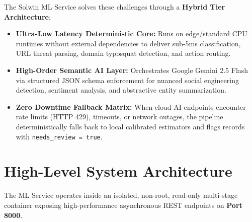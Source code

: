 \documentclass[11pt,a4paper]{article}
\begin{document}
The Solwin ML Service solves these challenges through a \textbf{Hybrid Tier Architecture}:
\begin{itemize}[leftmargin=*]
    \item \textbf{Ultra-Low Latency Deterministic Core:} Runs on edge/standard CPU runtimes without external dependencies to deliver sub-5ms classification, URL threat parsing, domain typosquat detection, and action routing.
    \item \textbf{High-Order Semantic AI Layer:} Orchestrates Google Gemini 2.5 Flash via structured JSON schema enforcement for nuanced social engineering detection, sentiment analysis, and abstractive entity summarization.
    \item \textbf{Zero Downtime Fallback Matrix:} When cloud AI endpoints encounter rate limits (HTTP 429), timeouts, or network outages, the pipeline deterministically falls back to local calibrated estimators and flags records with \texttt{needs\_review = true}.
\end{itemize}

\section{High-Level System Architecture}
The ML Service operates inside an isolated, non-root, read-only multi-stage container exposing high-performance asynchronous REST endpoints on \textbf{Port 8000}.
\end{document}
